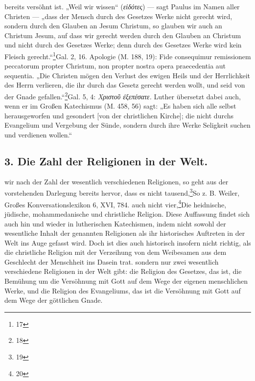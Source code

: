 bereits versöhnt ist. „Weil wir wissen“ (\emph{εἰδότες}) — sagt Paulus im Namen aller Christen — „dass der Mensch durch des Gesetzes Werke nicht gerecht wird, sondern durch den Glauben an Jesum Christum, so glauben wir auch an Christum Jesum, auf dass wir gerecht werden durch den Glauben an Christum und nicht durch des Gesetzes Werke; denn durch des Gesetzes Werke wird kein Fleisch gerecht.“\footnote{17}{Gal. 2, 16. Apologie (M. 188, 19): Fide consequimur remissionem peccatorum propter Christum, non propter nostra opera praecedentia aut sequentia.} „Die Christen mögen den Verlust des ewigen Heils und der Herrlichkeit des Herrn verlieren, die ihr durch das Gesetz gerecht werden wollt, und seid von der Gnade gefallen.“\footnote{18}{Gal. 5, 4: \emph{Χριστοῦ ἐξεπέσατε.} Luther übersetzt dabei auch, wenn er im Großen Katechismus (M. 458, 56) sagt: „Es haben sich alle selbst herausgeworfen und gesondert [von der christlichen Kirche]; die nicht durchs Evangelium und Vergebung der Sünde, sondern durch ihre Werke Seligkeit suchen und verdienen wollen.“}\n\n\subsection*{3. Die Zahl der Religionen in der Welt.}\n\nFragen wir nach der Zahl der wesentlich verschiedenen Religionen, so geht aus der vorstehenden Darlegung bereits hervor, dass es nicht tausend,\footnote{19}{So z. B. Weiler, Großes Konversationslexikon 6, XVI, 784.} auch nicht vier,\footnote{20}{Die heidnische, jüdische, mohammedanische und christliche Religion. Diese Auffassung findet sich auch hin und wieder in lutherischen Katechismen, indem nicht sowohl der wesentliche Inhalt der genannten Religionen als ihr historisches Auftreten in der Welt ins Auge gefasst wird. Doch ist dies auch historisch insofern nicht richtig, als die christliche Religion mit der Verzeihung von dem Weibesamen aus dem Geschlecht der Menschheit ins Dasein trat.} sondern nur zwei wesentlich verschiedene Religionen in der Welt gibt: die Religion des Gesetzes, das ist, die Bemühung um die Versöhnung mit Gott auf dem Wege der eigenen menschlichen Werke, und die Religion des Evangeliums, das ist die Versöhnung mit Gott auf dem Wege der göttlichen Gnade.